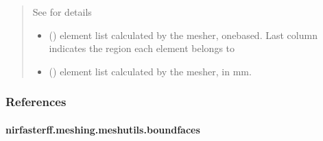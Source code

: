 \documentclass[letterpaper,10pt,english]{sphinxmanual}
\begin{document}
\begin{fulllineitems}
\begin{quote}
\begin{description}
\begin{itemize}
\sphinxAtStartPar
See {\hyperref[\detokenize{_autosummary/nirfasterff.utils.MeshingParams:nirfasterff.utils.MeshingParams}]{}} for details


\end{itemize}

\sphinxAtStartPar
\begin{itemize}
\item {} 
\sphinxAtStartPar
{} () \textendash{} element list calculated by the mesher, one\sphinxhyphen{}based. Last column indicates the region each element belongs to

\item {} 
\sphinxAtStartPar
{} () \textendash{} element list calculated by the mesher, in mm.

\end{itemize}


\end{description}\end{quote}
\subsubsection*{References}

\sphinxAtStartPar
{}

\end{fulllineitems}


\sphinxstepscope


\paragraph{nirfasterff.meshing.meshutils.boundfaces}
\label{\detokenize{_autosummary/nirfasterff.meshing.meshutils.boundfaces:nirfasterff-meshing-meshutils-boundfaces}}\label{\detokenize{_autosummary/nirfasterff.meshing.meshutils.boundfaces::doc}}
\end{document}
